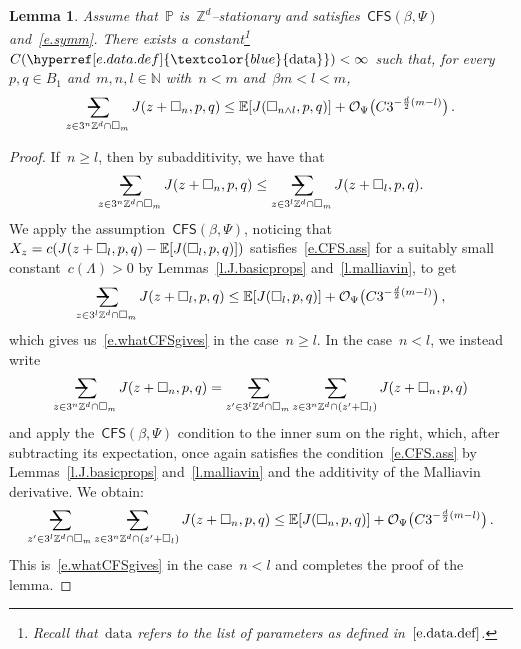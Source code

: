 \documentclass[11pt,twoside]{article} %
\makeatletter
\let\oldsquare\square %
\renewcommand{\square}{\oldsquare}
\numberwithin{equation}{section}
\newtheorem{lemma}[theorem]{Lemma}
\theoremstyle{definition}
\newcommand{\dataref}{\hyperref[e.data.def]{\textcolor{blue}{\ensuremath{\mathrm{data}}}}}
\let\originalleft\left
\let\originalright\right
\renewcommand{\left}{\mathopen{}\mathclose\bgroup\originalleft}
\renewcommand{\right}{\aftergroup\egroup\originalright}
\newcommand*{\N}{\ensuremath{\mathbb{N}}}
\newcommand*{\Zd}{\ensuremath{\mathbb{Z}^d}}
\newcommand{\cu}{\square}
\renewcommand{\P}{\mathbb{P}}
\newcommand{\E}{\mathbb{E}}
\renewcommand{\O}{\mathcal{O}}
\newcommand{\data}{\mathrm{data}}
\newcommand{\avsum}{\mathop{\mathpalette\avsuminner\relax}\displaylimits}
\newcommand\avsuminner[2]{%
  {\sbox0{$\m@th#1\sum$}%
   \vphantom{\usebox0}%
   \ooalign{%
     \hidewidth
     \smash{\,\rule[.23em]{8.8pt}{1.1pt} \relax}%
     \hidewidth\cr
   ~$\m@th#1\sum$\cr
   }%
  }%
}
\newcommand{\CFS}{\mathsf{CFS}}
\makeatother
\begin{document}
\begin{lemma}
\label{l.J.upperfluct}
Assume that~$\P$ is~$\Zd$--stationary and satisfies~$\CFS(\beta,\Psi)$ and~\eqref{e.symm}.
There exists a constant\footnote{Recall that~$\data$ refers to the list of parameters as defined in~$\eqref{e.data.def}$.}~$C(\dataref)<\infty$ such that, for every~$p,q\in B_1$ 
and~$m,n,l\in\N$ with~$n < m$ and~$\beta m < l < m$,
\begin{align}
\label{e.whatCFSgives}
\avsum_{z\in 3^n\Zd\cap \cu_m} 
J(z+\cu_n,p,q)
\leq 
\E \left[ J( \cu_{n\wedge l},p,q) \right]
+ 
\O_\Psi\bigl( C3^{-\frac d2(m-l)} \bigr)
\,.
\end{align}
\end{lemma}
\begin{proof}
If~$n\geq l$, then by subadditivity, we have that 
\begin{align*}
\avsum_{z\in 3^n\Zd\cap \cu_m} 
J(z+\cu_n,p,q)
\leq 
\avsum_{z\in 3^l\Zd\cap \cu_m} 
J(z+\cu_l,p,q).
\end{align*}
We apply the assumption~$\CFS(\beta,\Psi)$, noticing that~$X_z = c \left( J(z+\cu_l,p,q) - \E \left[ J(\cu_l,p,q) \right]\right)$ satisfies~\eqref{e.CFS.ass} for a suitably small constant~$c(\Lambda)>0$ by Lemmas~\ref{l.J.basicprops} and~\ref{l.malliavin}, 
to get
\begin{equation*}
\avsum_{z\in 3^l\Zd\cap \cu_m} 
J(z+\cu_l,p,q) 
\leq 
\E \left[ J(\cu_l,p,q) \right] 
+ 
\O_\Psi\bigl( C3^{-\frac d2(m-l)}\bigr)
\,,
\end{equation*}
which gives us~\eqref{e.whatCFSgives} in the case~$n\geq l$. 
In the case~$n<l$, we instead write 
\begin{equation*}
\avsum_{z\in 3^n\Zd\cap \cu_m} 
J(z+\cu_n,p,q)
=
\avsum_{z'\in 3^l\Zd\cap \cu_m}
\avsum_{z\in 3^n\Zd\cap (z'+\cu_l)} 
J(z+\cu_n,p,q)
\end{equation*}
and apply the~$\CFS(\beta,\Psi)$ condition to the inner sum on the right, which, after subtracting its expectation, once again satisfies the condition~\eqref{e.CFS.ass} by Lemmas~\ref{l.J.basicprops} and~\ref{l.malliavin} and the additivity of the Malliavin derivative. We obtain:
\begin{align*}
\avsum_{z'\in 3^l\Zd\cap \cu_m}
\avsum_{z\in 3^n\Zd\cap (z'+\cu_l)} 
J(z+\cu_n,p,q)
\leq 
\E \left[ J(\cu_n,p,q) \right] 
+
\O_\Psi\bigl( C3^{-\frac d2(m-l)} \bigr)
\,. 
\end{align*}
This is~\eqref{e.whatCFSgives} in the case~$n< l$ and completes the proof of the lemma. 
\end{proof}
\end{document}
